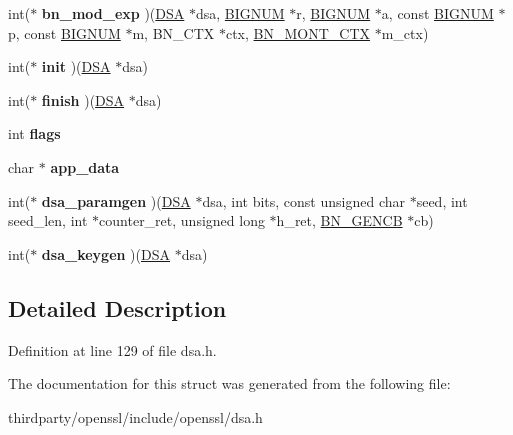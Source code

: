 \begin{DoxyCompactItemize}
\item 
\mbox{\label{structdsa__method_afeec883c6d822b9faa7a03f2217fc651}} 
int($\ast$ {\bfseries bn\+\_\+mod\+\_\+exp} )(\hyperlink{structdsa__st}{D\+SA} $\ast$dsa, \hyperlink{structbignum__st}{B\+I\+G\+N\+UM} $\ast$r, \hyperlink{structbignum__st}{B\+I\+G\+N\+UM} $\ast$a, const \hyperlink{structbignum__st}{B\+I\+G\+N\+UM} $\ast$p, const \hyperlink{structbignum__st}{B\+I\+G\+N\+UM} $\ast$m, B\+N\+\_\+\+C\+TX $\ast$ctx, \hyperlink{structbn__mont__ctx__st}{B\+N\+\_\+\+M\+O\+N\+T\+\_\+\+C\+TX} $\ast$m\+\_\+ctx)
\item 
\mbox{\label{structdsa__method_acfaf05310756308b9849f278cdfd91c6}} 
int($\ast$ {\bfseries init} )(\hyperlink{structdsa__st}{D\+SA} $\ast$dsa)
\item 
\mbox{\label{structdsa__method_aad9fed78046fe8c6f995ba9ee8bd59d2}} 
int($\ast$ {\bfseries finish} )(\hyperlink{structdsa__st}{D\+SA} $\ast$dsa)
\item 
\mbox{\label{structdsa__method_ae5a10b0b8d5b139e5818da8da5223ebc}} 
int {\bfseries flags}
\item 
\mbox{\label{structdsa__method_a08528c35da49dcebc0675cb9b66bbeb9}} 
char $\ast$ {\bfseries app\+\_\+data}
\item 
\mbox{\label{structdsa__method_a22d30cb3e62b00cbb818f7d2bacb99f7}} 
int($\ast$ {\bfseries dsa\+\_\+paramgen} )(\hyperlink{structdsa__st}{D\+SA} $\ast$dsa, int bits, const unsigned char $\ast$seed, int seed\+\_\+len, int $\ast$counter\+\_\+ret, unsigned long $\ast$h\+\_\+ret, \hyperlink{structbn__gencb__st}{B\+N\+\_\+\+G\+E\+N\+CB} $\ast$cb)
\item 
\mbox{\label{structdsa__method_a55bf9cc2d75b43788806388a6e924eb1}} 
int($\ast$ {\bfseries dsa\+\_\+keygen} )(\hyperlink{structdsa__st}{D\+SA} $\ast$dsa)
\end{DoxyCompactItemize}


\subsection{Detailed Description}


Definition at line 129 of file dsa.\+h.



The documentation for this struct was generated from the following file\+:\begin{DoxyCompactItemize}
\item 
thirdparty/openssl/include/openssl/dsa.\+h\end{DoxyCompactItemize}
